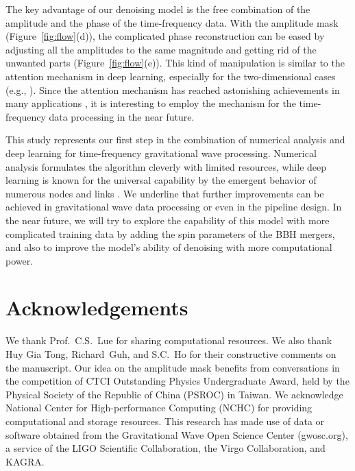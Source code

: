 \documentclass[preprint,12pt]{elsarticle}
\begin{document}
The key advantage of our denoising model is the free combination of the amplitude and the phase of the time-frequency data. 
With the amplitude mask (Figure~\ref{fig:flow}(d)), the complicated phase reconstruction can be eased by adjusting all the amplitudes to the same magnitude and getting rid of the unwanted parts (Figure~\ref{fig:flow}(e)).  
This kind of manipulation is similar to the attention mechanism \cite{vaswani2017attention} in deep learning, especially for the two-dimensional cases (e.g., \cite{dosovitskiy2020image}). 
Since the attention mechanism has reached astonishing achievements in many applications \cite{niu2021review}, it is interesting to employ the mechanism for the time-frequency data processing in the near future.

This study represents our first step in the combination of numerical analysis and deep learning for time-frequency gravitational wave processing. 
Numerical analysis formulates the algorithm cleverly with limited resources, while deep learning is known for the universal capability by the emergent behavior of numerous nodes and links \cite{cybenko1989approximation, hornik1989multilayer, leshno1993multilayer}. 
We underline that further improvements can be achieved in gravitational wave data processing or even in the pipeline design.
In the near future, we will try to explore the capability of this model with more complicated training data by adding the spin parameters of the BBH mergers, and also to improve the model's ability of denoising with more computational power.

\section*{Acknowledgements}
We thank Prof.~C.S.~Lue for sharing computational resources. 
We also thank Huy Gia Tong, Richard~Guh, and S.C.~Ho for their constructive comments on the manuscript. 
Our idea on the amplitude mask benefits from conversations in the competition of CTCI Outstanding Physics Undergraduate Award, held by the Physical Society of the Republic of China (PSROC) in Taiwan.
We acknowledge National Center for High-performance Computing (NCHC) for providing computational and storage resources. 
This research has made use of data or software obtained from the Gravitational Wave Open Science Center (gwosc.org), a service of the LIGO Scientific Collaboration, the Virgo Collaboration, and KAGRA.
\end{document}
